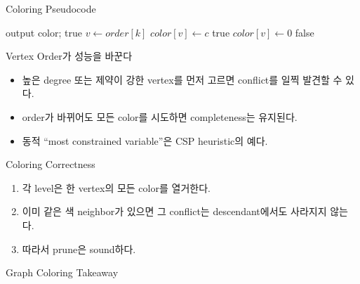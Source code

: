 \begin{frame}{Coloring Pseudocode}
\algofont\begin{algorithmic}[1]
\State output color; \Return true\EndIf
\State \(v\gets order[k]\)
\State \(color[v]\gets c\)
\State\Return true\EndIf
\State \(color[v]\gets0\)
\EndIf\EndFor
\State\Return false
\EndProcedure
\end{algorithmic}
\end{frame}
\begin{frame}{Vertex Order가 성능을 바꾼다}
\begin{itemize}
\item 높은 degree 또는 제약이 강한 vertex를 먼저 고르면 conflict를 일찍 발견할 수 있다.
\item order가 바뀌어도 모든 color를 시도하면 completeness는 유지된다.
\item 동적 “most constrained variable”은 CSP heuristic의 예다.
\end{itemize}
\end{frame}
\begin{frame}{Coloring Correctness}
\begin{enumerate}
\item 각 level은 한 vertex의 모든 color를 열거한다.
\item 이미 같은 색 neighbor가 있으면 그 conflict는 descendant에서도 사라지지 않는다.
\item 따라서 prune은 sound하다.
\end{enumerate}
\end{frame}
\begin{frame}{Graph Coloring Takeaway}
\end{frame}
